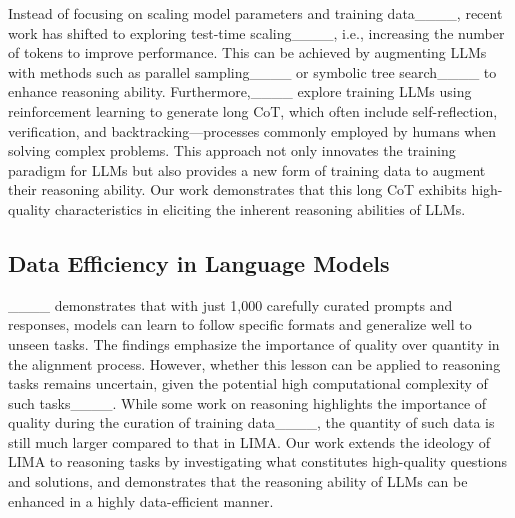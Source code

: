 Instead of focusing on scaling model parameters and training data____, recent work has shifted to exploring test-time scaling____, i.e., increasing the number of tokens to improve performance. This can be achieved by augmenting LLMs with methods such as parallel sampling____ or symbolic tree search____ to enhance reasoning ability. Furthermore,____ explore training LLMs using reinforcement learning to generate long CoT, which often include self-reflection, verification, and backtracking—processes commonly employed by humans when solving complex problems. This approach not only innovates the training paradigm for LLMs but also provides a new form of training data to augment their reasoning ability. Our work demonstrates that this long CoT exhibits high-quality characteristics in eliciting the inherent reasoning abilities of LLMs.



\subsection{Data Efficiency in Language Models}





____ demonstrates that with just 1,000 carefully curated prompts and responses, models can learn to follow specific formats and generalize well to unseen tasks. The findings emphasize the importance of quality over quantity in the alignment process. However, whether this lesson can be applied to reasoning tasks remains uncertain, given the potential high computational complexity of such tasks____. While some work on reasoning highlights the importance of quality during the curation of training data____, the quantity of such data is still much larger compared to that in LIMA. Our work extends the ideology of LIMA to reasoning tasks by investigating what constitutes high-quality questions and solutions, and demonstrates that the reasoning ability of LLMs can be enhanced in a highly data-efficient manner.